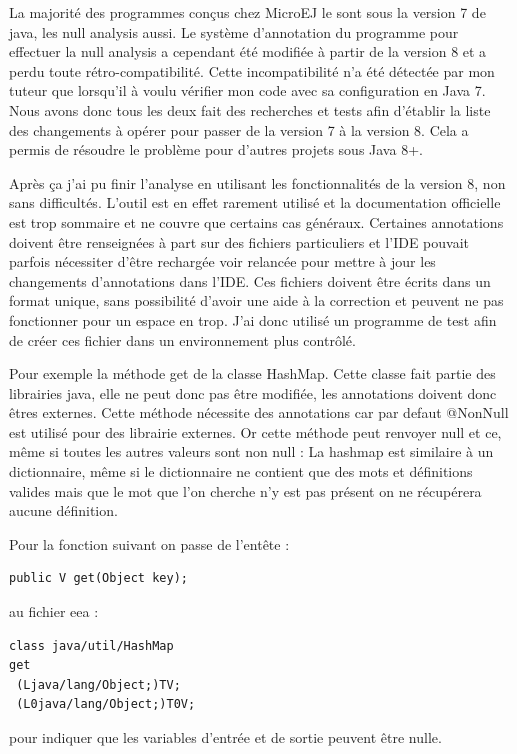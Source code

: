 \documentclass[french,a4paper,12pt]{report}
\begin{document}
La majorité des programmes conçus chez MicroEJ le sont sous la version 7 de java, les null analysis aussi. Le système d'annotation du programme pour effectuer la null analysis a cependant été modifiée à partir de la version 8 et a perdu toute rétro-compatibilité. Cette incompatibilité n'a été détectée par mon tuteur que lorsqu'il à voulu vérifier mon code avec sa configuration en Java 7. Nous avons donc tous les deux fait des recherches et tests afin d'établir la liste des changements à opérer pour passer de la version 7 à la version 8. 
Cela a permis de résoudre le problème pour d'autres projets sous Java 8+.

Après ça j'ai pu finir l'analyse en utilisant les fonctionnalités de la version 8, non sans difficultés. L’outil est en effet rarement utilisé et la documentation officielle est trop sommaire et ne couvre que certains cas généraux. Certaines annotations doivent être renseignées à part sur des fichiers particuliers et l'IDE pouvait parfois nécessiter d'être rechargée voir relancée pour mettre à jour les changements d'annotations dans l'IDE. Ces fichiers doivent être écrits dans un format unique, sans possibilité d'avoir une aide à la correction et peuvent ne pas fonctionner pour un espace en trop. J'ai donc utilisé un programme de test afin de créer ces fichier dans un environnement plus contrôlé.

Pour exemple la méthode get de la classe HashMap. Cette classe fait partie des librairies java, elle ne peut donc pas être modifiée, les annotations doivent donc êtres externes. Cette méthode nécessite des annotations car par defaut @NonNull est utilisé pour des librairie externes. Or cette méthode peut renvoyer null et ce, même si toutes les autres valeurs sont non null : La hashmap est similaire à un dictionnaire, même si le dictionnaire ne contient que des mots et définitions valides mais que le mot que l'on cherche n'y est pas présent on ne récupérera aucune définition.

Pour la fonction suivant on passe de l’entête :
\begin{lstlisting}
public V get(Object key);
\end{lstlisting}

au fichier eea :

\begin{verbatim}
class java/util/HashMap
get
 (Ljava/lang/Object;)TV;
 (L0java/lang/Object;)T0V;
\end{verbatim}

pour indiquer que les variables d'entrée et de sortie peuvent être nulle.
\end{document}
